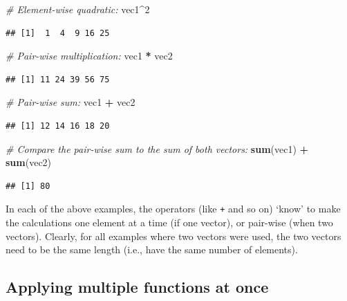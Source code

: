 \documentclass[]{book}
\newenvironment{Shaded}{\begin{snugshade}}{\end{snugshade}}
\newcommand{\CommentTok}[1]{\textcolor[rgb]{0.56,0.35,0.01}{\textit{#1}}}
\newcommand{\DecValTok}[1]{\textcolor[rgb]{0.00,0.00,0.81}{#1}}
\newcommand{\KeywordTok}[1]{\textcolor[rgb]{0.13,0.29,0.53}{\textbf{#1}}}
\newcommand{\NormalTok}[1]{#1}
\newcommand{\OperatorTok}[1]{\textcolor[rgb]{0.81,0.36,0.00}{\textbf{#1}}}
\newcommand{\StringTok}[1]{\textcolor[rgb]{0.31,0.60,0.02}{#1}}
\begin{document}
\begin{Shaded}
\begin{Highlighting}[]
\CommentTok{# Element-wise quadratic:}
\NormalTok{vec1}\OperatorTok{^}\DecValTok{2}
\end{Highlighting}
\end{Shaded}

\begin{verbatim}
## [1]  1  4  9 16 25
\end{verbatim}

\begin{Shaded}
\begin{Highlighting}[]
\CommentTok{# Pair-wise multiplication:}
\NormalTok{vec1 }\OperatorTok{*}\StringTok{ }\NormalTok{vec2}
\end{Highlighting}
\end{Shaded}

\begin{verbatim}
## [1] 11 24 39 56 75
\end{verbatim}

\begin{Shaded}
\begin{Highlighting}[]
\CommentTok{# Pair-wise sum:}
\NormalTok{vec1 }\OperatorTok{+}\StringTok{ }\NormalTok{vec2}
\end{Highlighting}
\end{Shaded}

\begin{verbatim}
## [1] 12 14 16 18 20
\end{verbatim}

\begin{Shaded}
\begin{Highlighting}[]
\CommentTok{# Compare the pair-wise sum to the sum of both vectors:}
\KeywordTok{sum}\NormalTok{(vec1) }\OperatorTok{+}\StringTok{ }\KeywordTok{sum}\NormalTok{(vec2)}
\end{Highlighting}
\end{Shaded}

\begin{verbatim}
## [1] 80
\end{verbatim}

In each of the above examples, the operators (like \texttt{+} and so on) `know' to make the calculations one element at a time (if one vector), or pair-wise (when two vectors). Clearly, for all examples where two vectors were used, the two vectors need to be the same length (i.e., have the same number of elements).

\hypertarget{multifunctions}{%
\subsection{Applying multiple functions at once}\label{multifunctions}}
\end{document}
